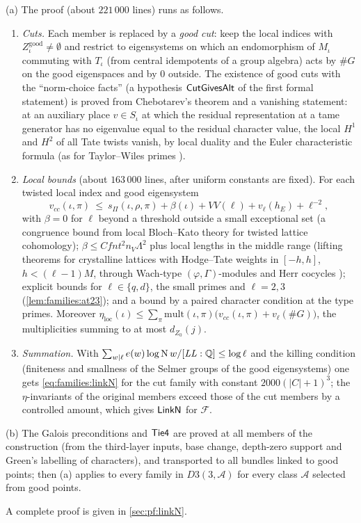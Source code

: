 \begin{proofoutline}
(a) The proof (about $221\,000$ lines) runs as follows.
\begin{enumerate}[label=\arabic*.]
\item \emph{Cuts.} Each member is replaced by a \emph{good cut}: keep the local indices with
$Z^{\mathrm{good}}_\iota\ne\emptyset$ and restrict to eigensystems on which an endomorphism of $M_\iota$ commuting
with $T_\iota$ (from central idempotents of a group algebra) acts by $\#G$ on the good eigenspaces and by $0$
outside. The existence of good cuts with the ``norm-choice facts'' (a hypothesis $\mathsf{CutGivesAlt}$ of the
first formal statement) is proved from Chebotarev's theorem and a vanishing statement: at an auxiliary place
$v\in S_\iota$ at which the residual representation at a tame generator has no eigenvalue equal to the residual
character value, the local $H^1$ and $H^2$ of all Tate twists vanish, by local duality and the Euler
characteristic formula (as for Taylor--Wiles primes \cite{TaylorWiles1995,DarmonDiamondTaylor1997}).
\item \emph{Local bounds} (about $163\,000$ lines, after uniform constants are fixed). For each twisted local index
and good eigensystem
\begin{equation}\label{eq:families:bd}
v_{cc}(\iota,\pi)\ \le\ s_\Pi(\iota,\rho,\pi)+\beta(\iota)+VV(\ell)+v_\ell(h_E)+\ell^{-2},
\end{equation}
with $\beta=0$ for $\ell$ beyond a threshold outside a small exceptional set (a congruence bound from local
Bloch--Kato theory for twisted lattice cohomology); $\beta\le Cfnt^2n_V\Lambda^2$ plus local lengths in the middle
range (lifting theorems for crystalline lattices with Hodge--Tate weights in $[-h,h]$, $h<(\ell-1)M$, through
Wach-type $(\varphi,\Gamma)$-modules and Herr cocycles \cite{Wach1996,Berger2004,Herr1998,FontaineLaffaille1982});
explicit bounds for $\ell\in\{q,d\}$, the small primes and $\ell=2,3$ (\cref{lem:families:at23}); and a bound by a
paired character condition at the type primes. Moreover $\eta_{\mathrm{loc}}(\iota)\le\sum_{\pi}\mathrm{mult}(\iota,\pi)
\bigl(v_{cc}(\iota,\pi)+v_\ell(\#G)\bigr)$, the multiplicities summing to at most $d_{Z_0}(j)$.
\item \emph{Summation.} With $\sum_{w\mid\ell}e(w)\log\operatorname{N} w/[\mathit{LL}:\mathbb{Q}]\le\log\ell$ and the killing condition
(finiteness and smallness of the Selmer groups of the good eigensystems) one gets \eqref{eq:families:linkN} for the
cut family with constant $2000(|C|+1)^3$; the $\eta$-invariants of the original members exceed those of the cut
members by a controlled amount, which gives $\mathsf{LinkN}$ for $\mathcal F$.
\end{enumerate}
(b) The Galois preconditions and $\mathsf{Tie4}$ are proved at all members of the construction (from the
third-layer inputs, base change, depth-zero support \cite{MoyPrasad1994} and Green's labelling of characters),
and transported to all bundles linked to good points; then (a) applies to every family in $D3(3,\mathcal A)$ for
every class $\mathcal A$ selected from good points.

A complete proof is given in \cref{sec:pf:linkN}.
\end{proofoutline}

